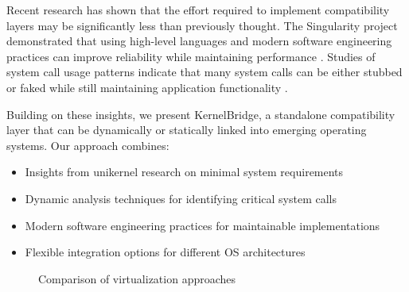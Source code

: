 \documentclass[conference]{IEEEtran}
\begin{document}
Recent research has shown that the effort required to implement compatibility layers may be significantly less than previously thought. The Singularity project demonstrated that using high-level languages and modern software engineering practices can improve reliability while maintaining performance \cite{singularity}. Studies of system call usage patterns indicate that many system calls can be either stubbed or faked while still maintaining application functionality \cite{lefeuvre2024loupe}.

Building on these insights, we present KernelBridge, a standalone compatibility layer that can be dynamically or statically linked into emerging operating systems. Our approach combines:
\begin{itemize}
	\item Insights from unikernel research on minimal system requirements
	\item Dynamic analysis techniques for identifying critical system calls
	\item Modern software engineering practices for maintainable implementations
	\item Flexible integration options for different OS architectures
\end{itemize}

\begin{figure}[t]
	\centering
	\caption{Comparison of virtualization approaches}
	\label{fig:kernels}
\end{figure}
\end{document}
